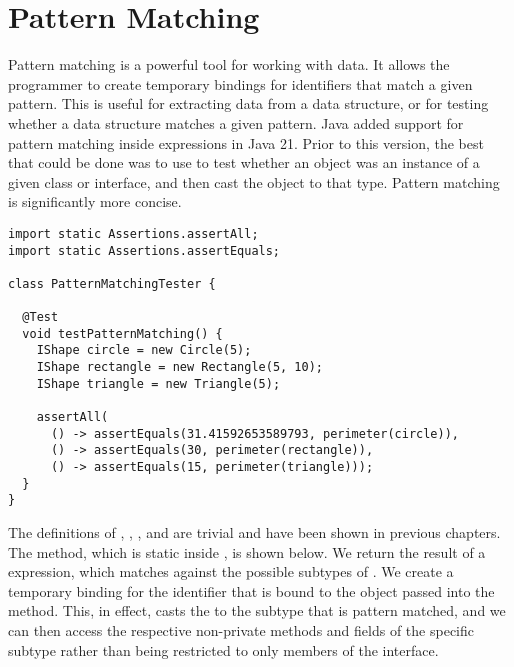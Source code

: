 \section{Pattern Matching}

Pattern matching is a powerful tool for working with data. It allows the programmer to create temporary bindings for identifiers that match a given pattern. This is useful for extracting data from a data structure, or for testing whether a data structure matches a given pattern. Java added support for pattern matching inside  expressions in Java 21. Prior to this version, the best that could be done was to use  to test whether an object was an instance of a given class or interface, and then cast the object to that type. Pattern matching is significantly more concise.


\begin{lstlisting}[language=MyJava]
import static Assertions.assertAll;
import static Assertions.assertEquals;

class PatternMatchingTester {

  @Test
  void testPatternMatching() {
    IShape circle = new Circle(5);
    IShape rectangle = new Rectangle(5, 10);
    IShape triangle = new Triangle(5);

    assertAll(
      () -> assertEquals(31.41592653589793, perimeter(circle)),
      () -> assertEquals(30, perimeter(rectangle)),
      () -> assertEquals(15, perimeter(triangle)));
  }
}
\end{lstlisting}

The definitions of , , , and  are trivial and have been shown in previous chapters. The  method, which is static inside , is shown below. We return the result of a  expression, which matches against the possible subtypes of . We create a temporary binding for the identifier  that is bound to the  object passed into the method. This, in effect, casts the  to the subtype that is pattern matched, and we can then access the respective non-private methods and fields of the specific subtype rather than being restricted to only members of the  interface.


